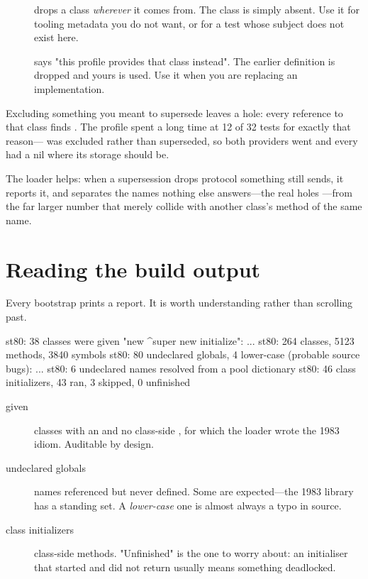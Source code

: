 \begin{description}
\item[] drops a class \emph{wherever} it comes from. The class
  is simply absent. Use it for tooling metadata you do not want, or for a test
  whose subject does not exist here.
\item[] says "this profile provides that class instead". The
  earlier definition is dropped and yours is used. Use it when you are
  replacing an implementation.
\end{description}

Excluding something you meant to supersede leaves a hole: every reference to
that class finds . The  profile spent a long time at
12 of 32 tests for exactly that reason--- was excluded rather
than superseded, so both providers went and every  had a nil where
its storage should be.

The loader helps: when a supersession drops protocol something still sends, it
reports it, and separates the names nothing else answers---the real holes
---from the far larger number that merely collide with another class's method
of the same name.

\section{Reading the build output}

Every bootstrap prints a report. It is worth understanding rather than
scrolling past.

\begin{plain}
st80: 38 classes were given "new ^super new initialize": ...
st80: 264 classes, 5123 methods, 3840 symbols
st80: 80 undeclared globals, 4 lower-case (probable source bugs): ...
st80: 6 undeclared names resolved from a pool dictionary
st80: 46 class initializers, 43 ran, 3 skipped, 0 unfinished
\end{plain}

\begin{description}
\item[given ] classes with an  and no class-side
  , for which the loader wrote the 1983 idiom. Auditable by design.
\item[undeclared globals] names referenced but never defined. Some are
  expected---the 1983 library has a standing set. A \emph{lower-case} one is
  almost always a typo in source.
\item[class initializers] class-side  methods. "Unfinished"
  is the one to worry about: an initialiser that started and did not return
  usually means something deadlocked.
\end{description}

